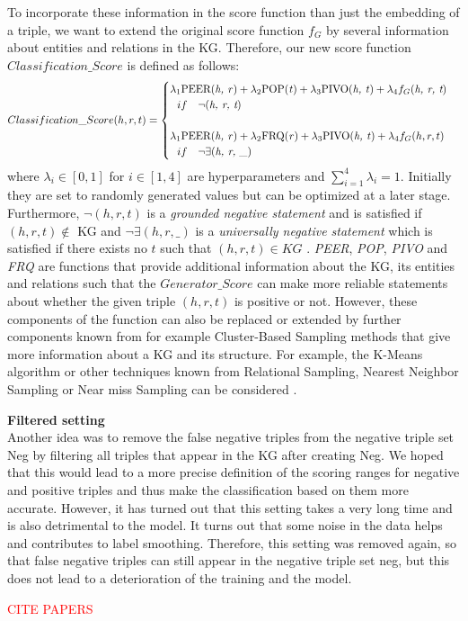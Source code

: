 To incorporate these information in the score function than just the embedding of a triple, we want to extend the original score function $f_G$ by several information about entities and relations in the \ac{KG}.
Therefore, our new score function $Classification\_Score$ is defined as follows:
\begin{equation}
    Classification\_Score(h, r, t)=
    \begin{cases}
         \lambda_1 \text{PEER(\textit{h, r})} + \lambda_2 \text{POP(\textit{t})} + \lambda_3 \text{PIVO(\textit{h, t})} + \lambda_4 f_G(\textit{h, r, t})
         \\ \ \ 
         if\ \ \ \neg(\textit{h, r, t})
         \\ \\
         \lambda_1 \text{PEER(\textit{h, r})} + \lambda_2 \text{FRQ(\textit{r})} + \lambda_3 \text{PIVO(\textit{h, t})} + \lambda_4 f_G(h, r, t)
         \\ \ \ 
         if\ \ \ \neg \exists (\textit{h, r, \_})
         \\
    \end{cases}
\end{equation}
where $\lambda_i \in [0, 1]$ for $i \in [1,4]$  are hyperparameters and $\sum_{i=1}^{4}\lambda_i = 1$.
Initially they are set to randomly generated values but can be optimized at a later stage.
Furthermore, $\neg (h, r, t)$ is a \textit{grounded negative statement} and is satisfied if $(h, r, t) \notin$ \ac{KG} and $\neg\exists(h, r, \_)$ is a \textit{universally negative statement} which is satisfied if there exists no $t$ such that $(h, r, t) \in KG$ \cite{arnaout2020enriching}.
\textit{PEER}, \textit{POP}, \textit{PIVO} and \textit{FRQ} are functions that provide additional information about the \ac{KG}, its entities and relations such that the $Generator\_Score$ can make more reliable statements about whether the given triple $(h, r, t)$ is positive or not.
However, these components of the function can also be replaced or extended by further components known from for example Cluster-Based Sampling methods that give more information about a \ac{KG} and its structure.
For example, the K-Means algorithm \cite{qianunderstanding} or other techniques known from Relational Sampling, Nearest Neighbor Sampling or Near miss Sampling can be considered \cite{kotnis2017analysis}.


\textbf{Filtered setting}\\

Another idea was to remove the false negative triples from the negative triple set Neg by filtering all triples that appear in the KG after creating Neg.
We hoped that this would lead to a more precise definition of the scoring ranges for negative and positive triples and thus make the classification based on them more accurate.
However, it has turned out that this setting takes a very long time and is also detrimental to the model.
It turns out that some noise in the data helps and contributes to label smoothing.
Therefore, this setting was removed again, so that false negative triples can still appear in the negative triple set neg, but this does not lead to a deterioration of the training and the model.

\textcolor{red}{CITE PAPERS}\\

